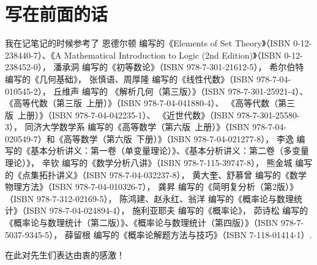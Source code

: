 \chapter*{写在前面的话}
我在记笔记的时候参考了
恩德尔顿 编写的《Elements of Set Theory》（ISBN 0-12-238440-7）、《A Mathematical Introduction to Logic (2nd Edition)》（ISBN 0-12-238452-0），
潘承洞 编写的《初等数论》（ISBN 978-7-301-21612-5），
希尔伯特 编写的《几何基础》，
张慎语、周厚隆 编写的《线性代数》（ISBN 978-7-04-010545-2），
丘维声 编写的
《解析几何（第三版）》（ISBN 978-7-301-25921-4）、
《高等代数（第三版\ 上册）》（ISBN 978-7-04-041880-4）、
《高等代数（第三版\ 上册）》（ISBN 978-7-04-042235-1）、
《近世代数》（ISBN 978-7-301-25580-3），
同济大学数学系 编写的《高等数学（第六版\ 上册）》（ISBN 978-7-04-020549-7）和《高等数学（第六版\ 下册）》（ISBN 978-7-04-021277-8），
李逸 编写的《基本分析讲义：第一卷（单变量理论）》、《基本分析讲义：第二卷（多变量理论）》，
辛钦 编写的《数学分析八讲》（ISBN 978-7-115-39747-8），
熊金城 编写的《点集拓扑讲义》（ISBN 978-7-04-032237-8），
黄大奎、舒慕曾 编写的《数学物理方法》（ISBN 978-7-04-010326-7），
龚昇 编写的《简明复分析（第2版）》（ISBN 978-7-312-02169-5），
陈鸿建、赵永红、翁洋 编写的《概率论与数理统计》（ISBN 978-7-04-024894-4），
施利亚耶夫 编写的《概率论》，
茆诗松 编写的《概率论与数理统计（第二版）》、《概率论与数理统计（第四版）》（ISBN 978-7-5037-9345-5），
薛留根 编写的《概率论解题方法与技巧》（ISBN 7-118-01414-1）.

在此对先生们表达由衷的感激！
